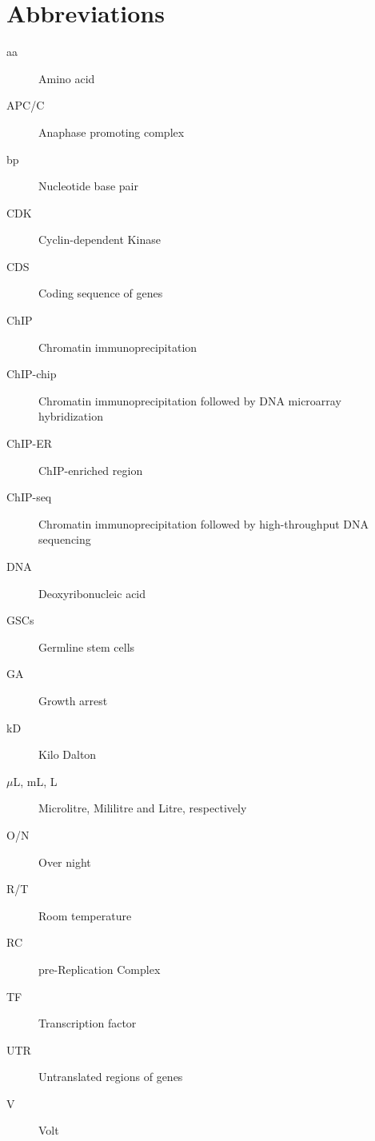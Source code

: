 \documentclass[11pt,twoside,a4paper]{report}
\begin{document}


\tableofcontents

\listoffigures

\listoftables

\chapter*{Abbreviations}
		\begin{description}
			\item[aa] Amino acid
			\item[APC/C] Anaphase promoting complex
			\item[bp] Nucleotide base pair
			\item[CDK] Cyclin-dependent Kinase
			\item[CDS] Coding sequence of genes
			\item[ChIP] Chromatin immunoprecipitation
			\item[ChIP-chip] Chromatin immunoprecipitation followed by DNA microarray hybridization 
			\item[ChIP-ER] ChIP-enriched region
			\item[ChIP-seq] Chromatin immunoprecipitation followed by high-throughput DNA sequencing
			\item[DNA] Deoxyribonucleic acid
			\item[GSCs] Germline stem cells
			\item[GA] Growth arrest
			\item[kD] Kilo Dalton
			\item[$\mu$L, mL, L] Microlitre, Mililitre and Litre, respectively
			\item[O/N] Over night
			\item[R/T] Room temperature
			\item[RC] pre-Replication Complex
			\item[TF] Transcription factor
			\item[UTR] Untranslated regions of genes
			\item[V] Volt
		\end{description}

\cleardoublepage
\end{document}
